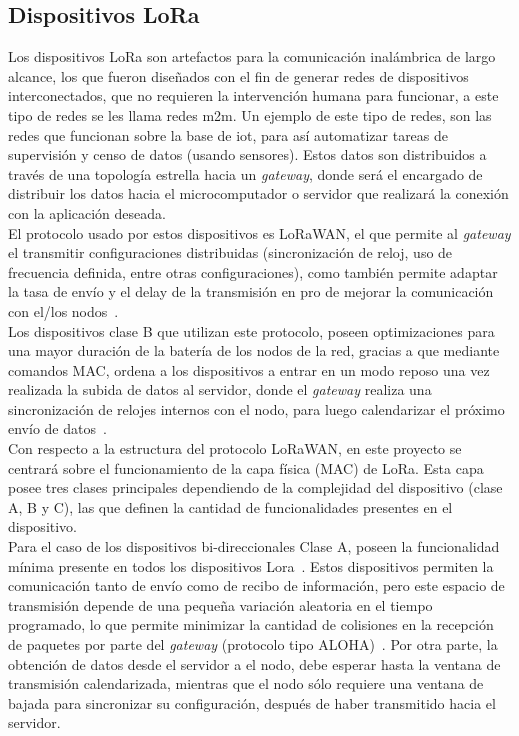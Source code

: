 \begin{justify}
\section{Dispositivos LoRa}
Los dispositivos LoRa son artefactos para la comunicación inalámbrica de largo alcance, los que fueron diseñados con el fin de generar redes de dispositivos interconectados, que no requieren la intervención humana para funcionar, a este tipo de redes se les llama redes \gls{m2m}. Un ejemplo de este tipo de redes, son las redes que funcionan sobre la base de \gls{iot}, para así automatizar tareas de supervisión y censo de datos (usando sensores). Estos datos son distribuidos a través de una topología estrella hacia un \textit{gateway}, donde será el encargado de distribuir los datos hacia el microcomputador o servidor que realizará la conexión con la aplicación deseada.\\
El protocolo usado por estos dispositivos es LoRaWAN, el que permite al \textit{gateway} el transmitir configuraciones distribuidas (sincronización de reloj, uso de frecuencia definida, entre otras configuraciones), como también permite adaptar la tasa de envío y el delay de  la transmisión en pro de mejorar la comunicación con el/los nodos~\cite{Sornin}.\\
Los dispositivos clase B que utilizan este protocolo, poseen optimizaciones para una mayor duración de la batería de los nodos de la red, gracias a que mediante comandos MAC, ordena a los dispositivos a entrar en un modo reposo una vez realizada la subida de datos al servidor, donde el \textit{gateway} realiza una sincronización de relojes internos con el nodo, para luego calendarizar el próximo envío de datos~\cite{Sornin}.\\
Con respecto a la estructura del protocolo LoRaWAN, en este proyecto se centrará sobre el funcionamiento de la capa física (MAC) de LoRa. Esta capa posee tres clases principales dependiendo de la complejidad del dispositivo (clase A, B y C), las que definen la cantidad de funcionalidades presentes en el dispositivo.\\
Para el caso de los dispositivos bi-direccionales Clase A, poseen la funcionalidad mínima presente en todos los dispositivos Lora~\cite{Sornin2}. Estos dispositivos permiten la comunicación tanto de envío como de recibo de información, pero este espacio de transmisión depende de una pequeña variación aleatoria en el tiempo programado, lo que permite minimizar la cantidad de colisiones en la recepción de paquetes por parte del \textit{gateway} (protocolo tipo ALOHA)~\cite{Sornin}. Por otra parte, la obtención de datos desde el servidor a el nodo, debe esperar hasta la ventana de transmisión calendarizada, mientras que el nodo sólo requiere una ventana de bajada para sincronizar su configuración, después de haber transmitido hacia el servidor.\\

\end{justify}
